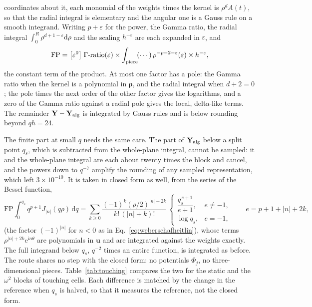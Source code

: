 \documentclass[11pt,a4paper]{article}
\newcommand{\brho}{\boldsymbol{\rho}}
\newcommand{\dd}{\mathrm{d}}
\newcommand{\ii}{\mathrm{i}}
\newcommand{\ee}{\mathrm{e}}
\begin{document}
coordinates about it, each monomial of the weights times the kernel is $\rho^{d}A(t)$, so that the radial
integral is elementary and the angular one is a Gauss rule on a smooth integrand. Writing $p+\varepsilon$ for
the power, the Gamma ratio, the radial integral $\int_0^{R}\rho^{d+1-\varepsilon}\dd\rho$ and the scaling
$h^{-\varepsilon}$ are each expanded in $\varepsilon$, and
\begin{equation}\label{eq:laurentconst}
  \mathrm{FP}=\bigl[\varepsilon^0\bigr]\;\Gamma\text{-ratio}(\varepsilon)\times
  \int_{\rm piece}\!(\cdots)\,\rho^{-p-2-\varepsilon}(\varepsilon)\times h^{-\varepsilon},
\end{equation}
the constant term of the product. At most one factor has a pole: the Gamma ratio when the kernel is a
polynomial in $\brho$, and the radial integral when $d+2=0$; the pole times the next order of the other factor
gives the logarithms, and a zero of the Gamma ratio against a radial pole gives the local, delta-like terms. The
remainder $\mathbf Y-\mathbf Y_{\rm alg}$ is integrated by Gauss rules and is below rounding beyond $qh=24$.

The finite part at small $q$ needs the same care. The part of $\mathbf Y_{\rm alg}$ below a split point $q_s$,
which is subtracted from the whole-plane integral, cannot be sampled: it and the whole-plane integral are each
about twenty times the block and cancel, and the powers down to $q^{-7}$ amplify the rounding of any sampled
representation, which left $3\times10^{-10}$. It is taken in closed form as well, from the series of the Bessel
function,
\begin{equation}\label{eq:headseries}
  \mathrm{FP}\!\int_0^{q_s}q^{p+1}J_{|n|}(q\rho)\,\dd q
  =\sum_{k\ge0}\frac{(-1)^k(\rho/2)^{|n|+2k}}{k!\,(|n|+k)!}\,
  \begin{cases}\dfrac{q_s^{\,e+1}}{e+1},&e\ne-1,\\[4pt] \log q_s,&e=-1,\end{cases}
  \qquad e=p+1+|n|+2k,
\end{equation}
(the factor $(-1)^{|n|}$ for $n<0$ as in Eq.~\eqref{eq:weberschafheitlin}), whose terms
$\rho^{|n|+2k}\ee^{\ii n\theta}$ are polynomials in $\mathbf u$ and are integrated against the weights
exactly. The full integrand below $q_s$, $q^{-2}$ times an entire function, is integrated as before. The route
shares no step with the closed form: no potentials $\Phi_j$, no three-dimensional pieces. Table~\ref{tab:touching}
compares the two for the static and the $\omega^2$ blocks of touching cells. Each difference is matched by the
change in the reference when $q_s$ is halved, so that it measures the reference, not the closed form.
\end{document}
